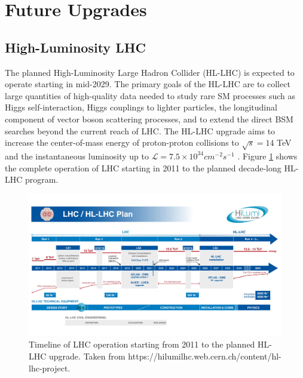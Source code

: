 \section{Future Upgrades}
\label{sec:FutureUpgrades}

\subsection{High-Luminosity LHC}
\label{subsec:HLLHC}
The planned High-Luminosity Large Hadron Collider (HL-LHC) is expected to operate starting in mid-2029. The primary goals of the HL-LHC are to collect large quantities of high-quality data needed to study rare SM processes such as Higgs self-interaction, Higgs couplings to lighter particles, the longitudinal component of vector boson scattering processes, and to extend the direct BSM searches beyond the current reach of LHC. The HL-LHC upgrade aims to increase the center-of-mass energy of proton-proton collisions to $\sqrt{s}=14$ TeV and the instantaneous luminosity up to $\mathcal L = 7.5 \times 10^{34} cm^{-2}s^{-1}$ \cite{HLLHC}. Figure \ref{fig:HLLHC} shows the complete operation of LHC starting in 2011 to the planned decade-long HL-LHC program. 

\begin{figure}[!htbp]
    \centering
    \includegraphics[width=.95\linewidth]{figures/LHC/HLLHCPlan.jpeg}
    \caption{ Timeline of LHC operation starting from 2011 to the planned HL-LHC upgrade. Taken from \small{https://hilumilhc.web.cern.ch/content/hl-lhc-project}.\label{fig:HLLHC}}
\end{figure}
\normalsize

